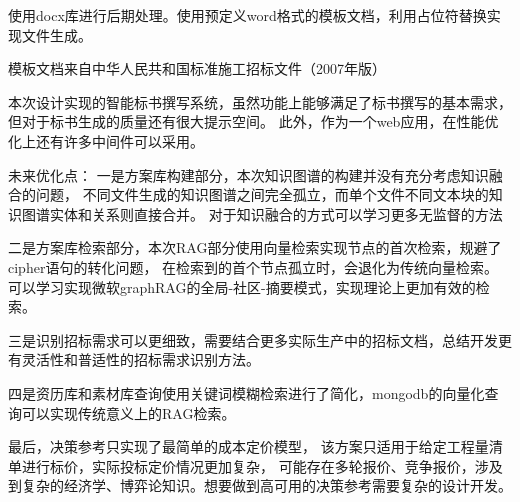 \documentclass{xmu}
\begin{document}
    使用docx库进行后期处理。使用预定义word格式的模板文档，利用占位符替换实现文件生成。

    模板文档来自中华人民共和国标准施工招标文件（2007年版）

本次设计实现的智能标书撰写系统，虽然功能上能够满足了标书撰写的基本需求，
但对于标书生成的质量还有很大提示空间。
此外，作为一个web应用，在性能优化上还有许多中间件可以采用。

未来优化点：
一是方案库构建部分，本次知识图谱的构建并没有充分考虑知识融合的问题，
不同文件生成的知识图谱之间完全孤立，而单个文件不同文本块的知识图谱实体和关系则直接合并。
对于知识融合的方式可以学习更多无监督的方法

二是方案库检索部分，本次RAG部分使用向量检索实现节点的首次检索，规避了cipher语句的转化问题，
在检索到的首个节点孤立时，会退化为传统向量检索。
可以学习实现微软graphRAG的全局-社区-摘要模式，实现理论上更加有效的检索。

三是识别招标需求可以更细致，需要结合更多实际生产中的招标文档，总结开发更有灵活性和普适性的招标需求识别方法。

四是资历库和素材库查询使用关键词模糊检索进行了简化，mongodb的向量化查询可以实现传统意义上的RAG检索。

最后，决策参考只实现了最简单的成本定价模型，
该方案只适用于给定工程量清单进行标价，实际投标定价情况更加复杂，
可能存在多轮报价、竞争报价，涉及到复杂的经济学、博弈论知识。想要做到高可用的决策参考需要复杂的设计开发。
\end{document}
